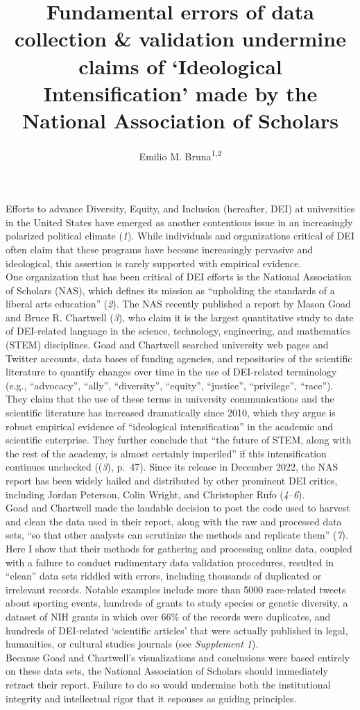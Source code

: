 \documentclass[
  12pt,
  man, donotrepeattitle]{apa6}
\title{Fundamental errors of data collection \& validation undermine claims of `Ideological Intensification' made by the National Association of Scholars}
\author{Emilio M. Bruna\textsuperscript{1,2}}
\date{}
\affiliation{\vspace{0.5cm}\textsuperscript{1} Department of Wildlife Ecology and Conservation, University of Florida, PO Box 110430, Gainesville, FL 32611-0430, USA\\\textsuperscript{2} Center for Latin American Studies, University of Florida, PO Box 115530, Gainesville, FL 32611-5530, USA}
\begin{document}
\maketitle

Efforts to advance Diversity, Equity, and Inclusion (hereafter, DEI) at universities in the United States have emerged as another contentious issue in an increasingly polarized political climate (\emph{1}). While individuals and organizations critical of DEI often claim that these programs have become increasingly pervasive and ideological, this assertion is rarely supported with empirical evidence.\\
One organization that has been critical of DEI efforts is the National Association of Scholars (NAS), which defines its mission as ``upholding the standards of a liberal arts education'' (\emph{2}). The NAS recently published a report by Mason Goad and Bruce R. Chartwell (\emph{3}), who claim it is the largest quantitative study to date of DEI-related language in the science, technology, engineering, and mathematics (STEM) disciplines. Goad and Chartwell searched university web pages and Twitter accounts, data bases of funding agencies, and repositories of the scientific literature to quantify changes over time in the use of DEI-related terminology (e.g., ``advocacy'', ``ally'', ``diversity'', ``equity'', ``justice'', ``privilege'', ``race''). They claim that the use of these terms in university communications and the scientific literature has increased dramatically since 2010, which they argue is robust empirical evidence of ``ideological intensification'' in the academic and scientific enterprise. They further conclude that ``the future of STEM, along with the rest of the academy, is almost certainly imperiled'' if this intensification continues unchecked ((\emph{3}), p.~47). Since its release in December 2022, the NAS report has been widely hailed and distributed by other prominent DEI critics, including Jordan Peterson, Colin Wright, and Christopher Rufo (\emph{4}--\emph{6}).\\
Goad and Chartwell made the laudable decision to post the code used to harvest and clean the data used in their report, along with the raw and processed data sets, ``so that other analysts can scrutinize the methods and replicate them'' (\emph{7}). Here I show that their methods for gathering and processing online data, coupled with a failure to conduct rudimentary data validation procedures, resulted in ``clean'' data sets riddled with errors, including thousands of duplicated or irrelevant records. Notable examples include more than 5000 race-related tweets about sporting events, hundreds of grants to study species or genetic diversity, a dataset of NIH grants in which over 66\% of the records were duplicates, and hundreds of DEI-related `scientific articles' that were actually published in legal, humanities, or cultural studies journals (see \emph{Supplement 1}).\\
Because Goad and Chartwell's visualizations and conclusions were based entirely on these data sets, the National Association of Scholars should immediately retract their report. Failure to do so would undermine both the institutional integrity and intellectual rigor that it espouses as guiding principles.
\end{document}
